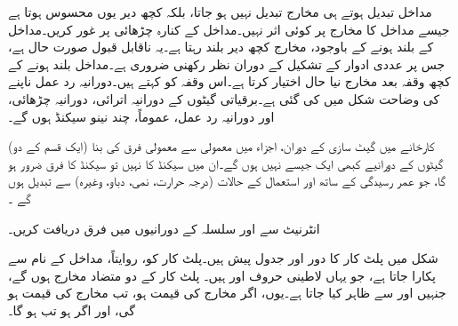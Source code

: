 مداخل تبدیل ہوتے ہی مخارج تبدیل نہیں ہو جاتا،  بلکہ کچھ دیر  یوں محسوس ہوتا ہے جیسے مداخل کا مخارج پر کوئی اثر نہیں۔مداخل کے کنارہ چڑھائی پر غور کریں۔مداخل کے بلند ہونے کے باوجود، مخارج کچھ دیر بلند  رہتا ہے۔یہ ناقابل قبول صورت حال ہے،  جس پر  عددی ادوار کے تشکیل کے دوران   نظر رکھنی   ضروری ہے۔مداخل بلند ہونے کے کچھ وقفہ بعد مخارج نیا  حال اختیار کرتا ہے۔اس وقفہ کو    کہتے ہیں۔دورانیہ رد عمل ناپنے کی وضاحت  شکل میں کی گئی ہے۔برقیاتی گیٹوں کے  دورانیہ اترائی،  دورانیہ چڑھائی،   اور دورانیہ رد عمل،  عموماً،  چند نینو سیکنڈ ہوں گے۔

کارخانے میں گیٹ سازی کے دوران، اجزاء میں  معمولی سے معمولی فرق کی بنا  (ایک قسم کے دو) گیٹوں کے دورانیے کبھی  ایک جیسے نہیں ہوں گے۔ان میں  سیکنڈ کا  نہیں تو سیکنڈ  کا فرق ضرور ہو گا، جو عمر رسیدگی کے ساتھ اور استعمال کے حالات  (درجہ حرارت، نمی، دباو،  وغیرہ)  سے   تبدیل ہوں گے ۔

انٹرنیٹ سے  اور  سلسلہ کے دورانیوں  میں فرق دریافت کریں۔

شکل    میں      پلٹ کار   کا دور اور جدول    پیش ہیں۔پلٹ کار کو،  روایتاً،  مداخل کے نام سے پکارا جاتا ہے، جو  یہاں  لاطینی حروف     اور    ہیں۔  پلٹ کار کے دو متضاد مخارج  ہوں گے،  جنہیں   اور  سے  ظاہر کیا جاتا ہے۔یوں، اگر  مخارج  کی قیمت   ہو،  تب  مخارج   کی   قیمت   ہو گی،   اور اگر    ہو تب  ہو گا۔



